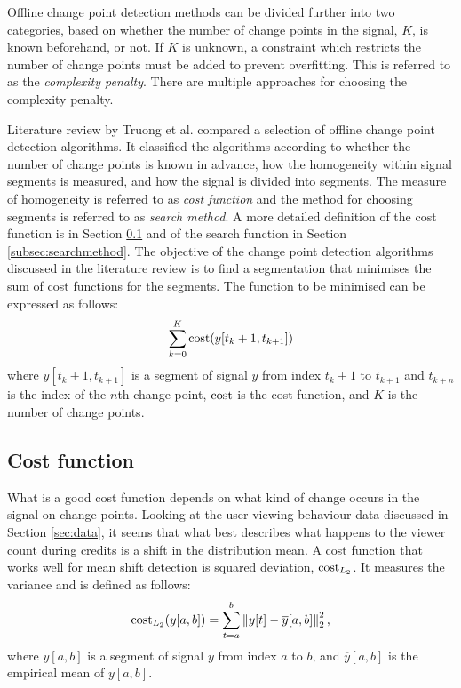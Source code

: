 Offline change point detection methods can be divided further into two categories, based on whether the number of change points in the signal, $K$, is known beforehand, or not. If $K$ is unknown, a constraint which restricts the number of change points must be added to prevent overfitting. This is referred to as the \textit{complexity penalty}. There are multiple approaches for choosing the complexity penalty.

Literature review by Truong et al. \cite{truongSelectiveReviewOffline2020} compared a selection of offline change point detection algorithms. It classified the algorithms according to whether the number of change points is known in advance, how the homogeneity within signal segments is measured, and how the signal is divided into segments. The measure of homogeneity is referred to as \textit{cost function} and the method for choosing segments is referred to as \textit{search method}. A more detailed definition of the cost function is in Section \ref{subsec:costfunction} and of the search function in Section \ref{subsec:searchmethod}. The objective of the change point detection algorithms discussed in the literature review is to find a segmentation that minimises the sum of cost functions for the segments. The function to be minimised can be expressed as follows:
\begin{equation}
  \sum_{k=0} ^{K}  \operatorname{cost}(y[t_k+1,t_{k+1}])
  \label{eq:minimise_segments}
\end{equation}
where $y[t_k+1,t_{k+1}]$ is a segment of signal $y$ from index $t_k+1$ to $t_{k+1}$ and $t_{k+n}$ is the index of the $n$th change point, $\operatorname{cost}$ is the cost function, and $K$ is the number of change points.

\subsection{Cost function} \label{subsec:costfunction}

What is a good cost function depends on what kind of change occurs in the signal on change points. Looking at the user viewing behaviour data discussed in Section \ref{sec:data}, it seems that what best describes what happens to the viewer count during credits is a shift in the distribution mean. A cost function that works well for mean shift detection is squared deviation, $\operatorname{cost}_{L_2}$. It measures the variance and is defined as follows:
\begin{equation}
  \operatorname{cost}_{L_2}(y[a,b]) = \sum^b_{t=a} \left\lVert y[t]-\overline{y}[a,b] \right\rVert ^2_2
    \label{eq:l2} \text{,}
\end{equation}
where $y[a,b]$ is a segment of signal $y$ from index $a$ to $b$, and  $\overline{y}[a,b]$ is the empirical mean of $y[a,b]$.

